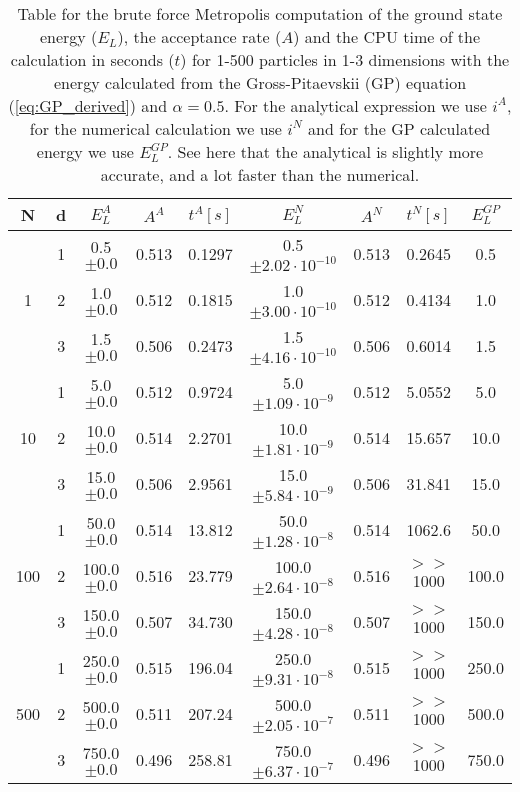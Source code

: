 \documentclass[12pt,a4paper,english]{article}
\begin{document}
\begin{table}[htbp!]
	\centering
	\begin{tabular}{ |c|c|c|c|c|c|c|c|c| }
		\hline \rule{0pt}{13pt}
		N & d & $E_L^A$ & $A^A$ & $t^A[s]$ & $E_L^N$ & $A^N$ & $t^N[s]$ & $E_L^{GP}$ \\
		\hline \rule{0pt}{13pt}
		 & 1 & 0.5$\pm0.0$ & 0.513 & 0.1297 & 0.5$\pm2.02\cdot10^{-10}$ & 0.513 & 0.2645 & 0.5\\
		1 & 2 & 1.0$\pm0.0$ & 0.512 & 0.1815 & 1.0$\pm3.00\cdot10^{-10}$ & 0.512 & 0.4134 & 1.0\\
		 & 3 & 1.5$\pm0.0$ & 0.506 & 0.2473 & 1.5$\pm4.16\cdot10^{-10}$ & 0.506 & 0.6014 & 1.5\\
		\hline \rule{0pt}{13pt}
		 & 1 & 5.0$\pm0.0$ & 0.512 & 0.9724 & 5.0$\pm1.09\cdot10^{-9}$ & 0.512 & 5.0552 & 5.0\\
		10 & 2 & 10.0$\pm0.0$ & 0.514 & 2.2701 & 10.0$\pm1.81\cdot10^{-9}$ & 0.514 & 15.657 & 10.0\\
		& 3 & 15.0$\pm0.0$ & 0.506 & 2.9561 & 15.0$\pm5.84\cdot10^{-9}$ & 0.506 & 31.841 & 15.0\\
		\hline \rule{0pt}{13pt}
		 & 1 & 50.0$\pm0.0$ & 0.514 & 13.812 & 50.0$\pm1.28\cdot10^{-8}$ & 0.514 & 1062.6 & 50.0\\
		100 & 2 & 100.0$\pm0.0$ & 0.516 & 23.779 & 100.0$\pm 2.64\cdot10^{-8}$ & 0.516 & $>>$1000 & 100.0\\
		& 3 & 150.0$\pm0.0$ & 0.507 & 34.730 & 150.0$\pm4.28\cdot10^{-8}$ & 0.507 & $>>$1000 & 150.0\\
		\hline \rule{0pt}{13pt}
		 & 1 & 250.0$\pm0.0$ & 0.515 & 196.04 & 250.0$\pm9.31\cdot10^{-8}$ & 0.515 & $>>$1000 & 250.0\\
		500 & 2 & 500.0$\pm0.0$ & 0.511 & 207.24 & 500.0$\pm2.05\cdot10^{-7}$ & 0.511 & $>>$1000 & 500.0\\
		& 3 & 750.0$\pm0.0$ & 0.496 & 258.81 & 750.0$\pm6.37\cdot10^{-7}$ & 0.496 & $>>$1000 & 750.0\\
		\hline
	\end{tabular}	
	\caption{Table for the brute force Metropolis computation of the ground state energy ($E_L$), the acceptance rate ($A$) and the CPU time of the calculation in seconds ($t$) for 1-500 particles in 1-3 dimensions with the energy calculated from the Gross-Pitaevskii (GP) equation (\ref{eq:GP_derived}) and $\alpha=0.5$. For the analytical expression we use $i^A$, for the numerical calculation we use $i^N$ and for the GP calculated energy we use $E_L^{GP}$. See here that the analytical is slightly more accurate, and a lot faster than the numerical. \label{tab:analytic_vs_numeric}}
\end{table}
\end{document}
